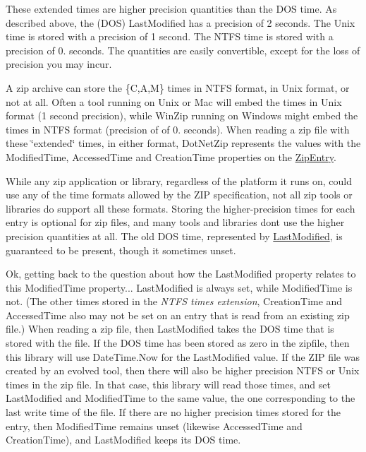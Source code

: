 These extended times are higher precision quantities than the D\+OS time. As described above, the (D\+OS) Last\+Modified has a precision of 2 seconds. The Unix time is stored with a precision of 1 second. The N\+T\+FS time is stored with a precision of 0. seconds. The quantities are easily convertible, except for the loss of precision you may incur. 

A zip archive can store the \{C,A,M\} times in N\+T\+FS format, in Unix format, or not at all. Often a tool running on Unix or Mac will embed the times in Unix format (1 second precision), while Win\+Zip running on Windows might embed the times in N\+T\+FS format (precision of of 0. seconds). When reading a zip file with these \char`\"{}extended\char`\"{} times, in either format, Dot\+Net\+Zip represents the values with the {\ttfamily Modified\+Time}, {\ttfamily Accessed\+Time} and {\ttfamily Creation\+Time} properties on the {\ttfamily \mbox{\hyperlink{class_super_tiled2_unity_1_1_ionic_1_1_zip_1_1_zip_entry}{Zip\+Entry}}}. 

While any zip application or library, regardless of the platform it runs on, could use any of the time formats allowed by the Z\+IP specification, not all zip tools or libraries do support all these formats. Storing the higher-\/precision times for each entry is optional for zip files, and many tools and libraries don\textquotesingle{}t use the higher precision quantities at all. The old D\+OS time, represented by \mbox{\hyperlink{class_super_tiled2_unity_1_1_ionic_1_1_zip_1_1_zip_entry_acd1234fd27c216b59c166c2b96aba3dd}{Last\+Modified}}, is guaranteed to be present, though it sometimes unset. 

Ok, getting back to the question about how the {\ttfamily Last\+Modified} property relates to this {\ttfamily Modified\+Time} property... {\ttfamily Last\+Modified} is always set, while {\ttfamily Modified\+Time} is not. (The other times stored in the {\itshape N\+T\+FS times extension}, {\ttfamily Creation\+Time} and {\ttfamily Accessed\+Time} also may not be set on an entry that is read from an existing zip file.) When reading a zip file, then {\ttfamily Last\+Modified} takes the D\+OS time that is stored with the file. If the D\+OS time has been stored as zero in the zipfile, then this library will use {\ttfamily Date\+Time.\+Now} for the {\ttfamily Last\+Modified} value. If the Z\+IP file was created by an evolved tool, then there will also be higher precision N\+T\+FS or Unix times in the zip file. In that case, this library will read those times, and set {\ttfamily Last\+Modified} and {\ttfamily Modified\+Time} to the same value, the one corresponding to the last write time of the file. If there are no higher precision times stored for the entry, then {\ttfamily Modified\+Time} remains unset (likewise {\ttfamily Accessed\+Time} and {\ttfamily Creation\+Time}), and {\ttfamily Last\+Modified} keeps its D\+OS time. 

